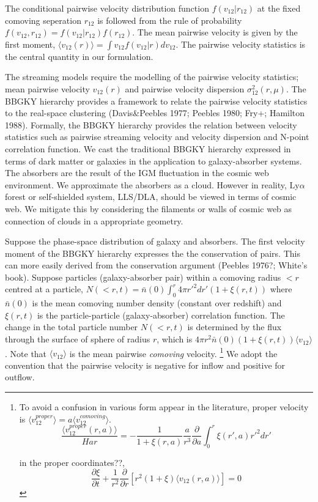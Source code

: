 \documentclass[useAMS,usenatbib,twocolumn]{mn2e}
\newcommand{\LyA}{\mbox{Ly}\alpha}
\begin{document}
The conditional pairwise velocity distribution function $f(v_{12}|r_{12})$
at the fixed comoving seperation $r_{12}$ is followed from the rule of 
probability $f(v_{12},r_{12})=f(v_{12}|r_{12})f(r_{12})$. The mean pairwise velocity
is given by the first moment, $\langle v_{12}(r)\rangle=\int v_{12}f(v_{12}|r)
dv_{12}$. The pairwise velocity statistics is the central quantity in 
our formulation.


The streaming models require the modelling of the pairwise velocity statistics;
mean pairwise velocity $v_{12}(r)$ and pairwise velocity dispersion 
$\sigma_{12}^2(r,\mu)$. The BBGKY hierarchy provides a framework to relate the 
pairwise velocity statistics to the real-space clustering (Davis\&Peebles 1977;
Peebles 1980; Fry+; Hamilton 1988). Formally, the BBGKY hierarchy provides the
relation between velocity statistics such as pairwise streaming velocity
and velocity dispersion and N-point correlation function. 
We cast the traditional BBGKY hierarchy expressed in terms of dark matter or 
galaxies in the application to galaxy-absorber systems. The absorbers are the 
result of the IGM fluctuation in the cosmic web environment. 
We approximate the absorbers as a cloud. 
However in reality, $\LyA$ forest or self-shielded system, LLS/DLA, should be
viewed in terms of cosmic web. We mitigate this by considering the filaments or
walls of cosmic web as connection of clouds in a appropriate geometry. 

Suppose the phase-space distribution of galaxy and absorbers.
The first velocity moment of the BBGKY hierarchy expresses the
the conservation of pairs. This can more easily derived from the conservation
argument (Peebles 1976?; White's book). Suppose particles 
(galaxy-absorber pair) within a comoving radius $<r$ centred at a
particle, $N(<r,t)=\bar{n}(0)\int^r_0 4\pi r'^2dr'(1+\xi(r,t))$ where 
$\bar{n}(0)$ is the mean comoving number density (constant over redshift)
and $\xi(r,t)$ is the particle-particle (galaxy-absorber) correlation function.
The change in the total particle number $N(<r,t)$ is determined by the flux 
through the surface of sphere of radius $r$, which is 
$4\pi r^2\bar{n}(0)(1+\xi(r,t))\langle v_{12}\rangle$. Note that
$\langle v_{12}\rangle$ is the mean pairwise \textit{comoving} velocity.
\footnote{To avoid a confusion in various form appear in the literature,
proper velocity is $\langle v_{12}^{proper}\rangle=
a\langle v_{12}^{comoving}\rangle$.
\begin{equation}
\frac{\langle v_{12}^{proper}(r,a)\rangle}{Har}=-\frac{1}{1+\xi(r,a)}\frac{a}{r^3}
\frac{\partial}{\partial a}\int_0^r\xi(r',a)r'^2dr'
\end{equation}

 in the proper coordinates??,  
\begin{equation}
\frac{\partial \xi}{\partial t}+\frac{1}{r^2}
\frac{\partial}{\partial r}\left[r^2(1+\xi)\langle v_{12}(r,a)\rangle\right]=0
\end{equation}
}
We adopt the convention that the pairwise velocity is negative
for inflow and positive for outflow.
\end{document}
